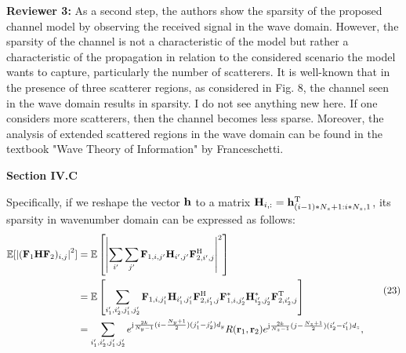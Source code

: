 \documentclass[a4paper,12pt]{article}
\begin{document}
\textbf{Reviewer 3:}
As a second step, the authors show the sparsity of the proposed channel model by observing the received signal in the wave domain. However, the sparsity of the channel is not a characteristic of the model but rather a characteristic of the propagation in relation to the considered scenario the model wants to capture, particularly the number of scatterers. It is well-known that in the presence of three scatterer regions, as considered in Fig. 8, the channel seen in the wave domain results in sparsity. I do not see anything new here. If one considers more scatterers, then the channel becomes less sparse. Moreover, the analysis of extended scattered regions in the wave domain can be found in the textbook "Wave Theory of Information" by Franceschetti.

{}

\begin{framed}
	{\bf Section IV.C}

	 Specifically, if we reshape the vector ${\bf h}$ to a matrix ${\bf H}_{i,:} = {\bf h}_{(i-1)*N_z+1:i*N_z,1}^{\rm T}$, its sparsity in wavenumber domain can be expressed as follows:
	\begin{equation}
		\begin{aligned}
			{\mathbb E}[\left|({\bf F}_1{\bf H}{\bf F}_2)_{i,j}\right|^2] &= {\mathbb E}\left[ \left| \sum_{i'}\sum_{j'}{\bf F}_{1,i,j'}{\bf H}_{i',j'}{\bf F}_{2,i',j}^{\rm H} \right|^2 \right]
			\\& ={\mathbb E}\left[ \sum_{i'_1,i'_2,j'_1,j'_2}{\bf F}_{1,i,j'_1}{\bf H}_{i'_1,j'_1}{\bf F}_{2,i'_1,j}^{\rm H}{\bf F}^{*}_{1,i,j'_2}{\bf H}^{*}_{i'_2,j'_2}{\bf F}_{2,i'_2,j}^{\rm T}\right]
			\\& = \sum_{i_1',i_2',j'_1,j'_2} e^{{\rm j}\frac{2k}{N_y-1}(i-\frac{N_y+1}{2})(j_1'-j_2')d_y}R({\bf r}_1,{\bf r}_2)
			e^{{\rm j}\frac{2k}{N_z-1}(j-\frac{N_z+1}{2})(i_2'-i_1')d_z},
		\end{aligned}
		\tag{23}
	\end{equation}
\end{framed}
\end{document}
